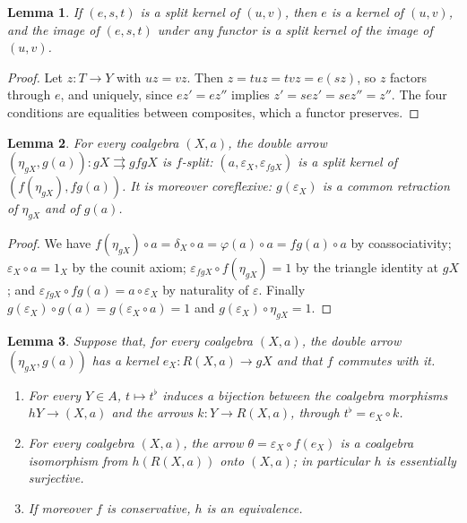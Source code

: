 \documentclass[11pt]{article}
\theoremstyle{plain}
\newtheorem{lemme}{Lemma}[section]
\theoremstyle{definition}
\theoremstyle{remark}
\begin{document}
\begin{lemme}\label{lem:19-scinde}
If $(e, s, t)$ is a split kernel of $(u, v)$, then $e$ is a kernel of $(u, v)$, and the image of $(e, s, t)$ under any functor is a split kernel of the image of $(u, v)$.
\end{lemme}

\begin{proof}
Let $z : T \to Y$ with $uz = vz$. Then $z = tuz = tvz = e(sz)$, so $z$ factors through $e$, and uniquely, since $ez' = ez''$ implies $z' = sez' = sez'' = z''$. The four conditions are equalities between composites, which a functor preserves.
\end{proof}

\begin{lemme}\label{lem:19-paire}
For every coalgebra $(X, a)$, the double arrow $(\eta_{gX}, g(a)) : gX \rightrightarrows gfgX$ is $f$-split: $(a, \varepsilon_X, \varepsilon_{fgX})$ is a split kernel of $(f(\eta_{gX}), fg(a))$. It is moreover coreflexive: $g(\varepsilon_X)$ is a common retraction of $\eta_{gX}$ and of $g(a)$.
\end{lemme}

\begin{proof}
We have $f(\eta_{gX}) \circ a = \delta_X \circ a = \varphi(a) \circ a = fg(a) \circ a$ by coassociativity; $\varepsilon_X \circ a = 1_X$ by the counit axiom; $\varepsilon_{fgX} \circ f(\eta_{gX}) = 1$ by the triangle identity at $gX$; and $\varepsilon_{fgX} \circ fg(a) = a \circ \varepsilon_X$ by naturality of $\varepsilon$. Finally $g(\varepsilon_X) \circ g(a) = g(\varepsilon_X \circ a) = 1$ and $g(\varepsilon_X) \circ \eta_{gX} = 1$.
\end{proof}

\begin{lemme}\label{lem:19-comp}
Suppose that, for every coalgebra $(X, a)$, the double arrow $(\eta_{gX}, g(a))$ has a kernel $e_X : R(X, a) \to gX$ and that $f$ commutes with it.
\begin{enumerate}
\item For every $Y \in A$, $t \mapsto t^\flat$ induces a bijection between the coalgebra morphisms $hY \to (X, a)$ and the arrows $k : Y \to R(X, a)$, through $t^\flat = e_X \circ k$.
\item For every coalgebra $(X, a)$, the arrow $\theta = \varepsilon_X \circ f(e_X)$ is a coalgebra isomorphism from $h(R(X, a))$ onto $(X, a)$; in particular $h$ is essentially surjective.
\item If moreover $f$ is conservative, $h$ is an equivalence.
\end{enumerate}
\end{lemme}
\end{document}
